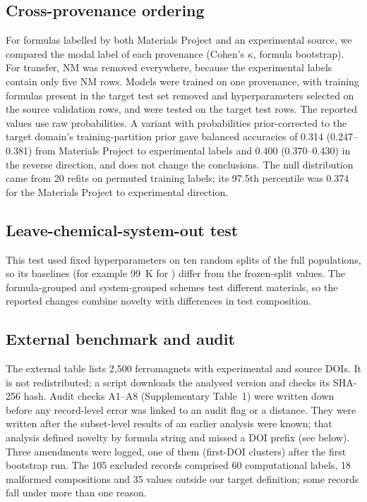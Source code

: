 \documentclass[11pt,a4paper]{article}
\begin{document}
\subsection*{Cross-provenance ordering}
For formulas labelled by both Materials Project and an experimental source, we compared the modal label of each provenance (Cohen's $\kappa$, formula bootstrap). For transfer, NM was removed everywhere, because the experimental labels contain only five NM rows. Models were trained on one provenance, with training formulas present in the target test set removed and hyperparameters selected on the source validation rows, and were tested on the target test rows. The reported values use raw probabilities. A variant with probabilities prior-corrected to the target domain's training-partition prior gave balanced accuracies of 0.314 (0.247--0.381) from Materials Project to experimental labels and 0.400 (0.370--0.430) in the reverse direction, and does not change the conclusions. The null distribution came from 20 refits on permuted training labels; its 97.5th percentile was 0.374 for the Materials Project to experimental direction.

\subsection*{Leave-chemical-system-out test}
This test used fixed hyperparameters on ten random splits of the full populations, so its baselines (for example 99~K for \Tc{}) differ from the frozen-split values. The formula-grouped and system-grouped schemes test different materials, so the reported changes combine novelty with differences in test composition.

\subsection*{External benchmark and audit}
The external table\cite{malaei_magnetic_data,abediorang2026curie} lists 2,500 ferromagnets with experimental \Tc{} and source DOIs. It is not redistributed; a script downloads the analysed version and checks its SHA-256 hash. Audit checks A1--A8 (Supplementary Table~1) were written down before any record-level error was linked to an audit flag or a distance. They were written after the subset-level results of an earlier analysis were known; that analysis defined novelty by formula string and missed a DOI prefix (see below). Three amendments were logged, one of them (first-DOI clusters) after the first bootstrap run. The 105 excluded records comprised 60 computational labels, 18 malformed compositions and 35 values outside our target definition; some records fall under more than one reason.
\end{document}
